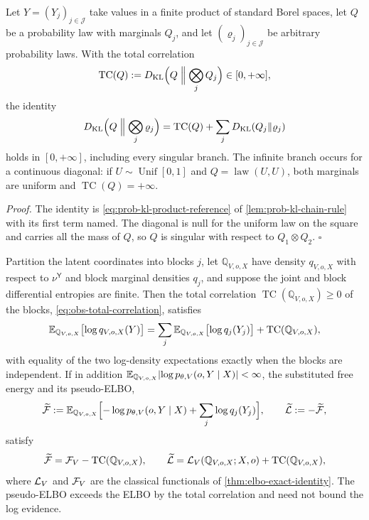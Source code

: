 Let $Y=(Y_j)_{j\in\mathcal J}$ take values in a finite product of standard
Borel spaces, let $Q$ be a probability law with marginals $Q_j$, and let
$(\varrho_j)_{j\in\mathcal J}$ be arbitrary probability laws. With the total
correlation
\begin{equation}
\operatorname{TC}(Q):=D_{\mathrm{KL}}\Bigl(Q\Bigm\Vert\bigotimes_{j}Q_j\Bigr)\in[0,+\infty],
\label{eq:obs-total-correlation}
\end{equation}
the identity
\begin{equation}
D_{\mathrm{KL}}\Bigl(Q\Bigm\Vert\bigotimes_j\varrho_j\Bigr)
=\operatorname{TC}(Q)+\sum_jD_{\mathrm{KL}}(Q_j\Vert\varrho_j)
\label{eq:elbo-total-correlation-chain}
\end{equation}
holds in $[0,+\infty]$, including every singular branch. The infinite branch
occurs for a continuous diagonal: if $U\sim\operatorname{Unif}[0,1]$ and
$Q=\operatorname{law}(U,U)$, both marginals are uniform and
$\operatorname{TC}(Q)=+\infty$. 

\noindent\emph{Proof.}
The identity is \eqref{eq:prob-kl-product-reference} of
\cref{lem:prob-kl-chain-rule} with its first term named. The diagonal is null
for the uniform law on the square and carries all the mass of $Q$, so $Q$ is
singular with respect to $Q_1\otimes Q_2$. \hfill$\square$

Partition the latent coordinates into blocks $j$, let $\mathbb Q_{V,o,X}$
have density $q_{V,o,X}$ with respect to $\nu^{\mathsf Y}$ and block marginal
densities $q_j$, and suppose the joint and block differential entropies are
finite. Then the total correlation
$\operatorname{TC}(\mathbb Q_{V,o,X})\geq0$ of the blocks,
\eqref{eq:obs-total-correlation}, satisfies
\begin{equation}
\mathbb E_{\mathbb Q_{V,o,X}}\bigl[\log q_{V,o,X}(Y)\bigr]
=\sum_j\mathbb E_{\mathbb Q_{V,o,X}}\bigl[\log q_j(Y_j)\bigr]
+\operatorname{TC}(\mathbb Q_{V,o,X}),
\label{eq:elbo-entropy-defect}
\end{equation}
with equality of the two log-density expectations exactly when the blocks are
independent. If in addition
$\mathbb E_{\mathbb Q_{V,o,X}}\lvert\log p_{\theta,V}(o,Y\mid X)\rvert<\infty$, the
substituted free energy and its pseudo-ELBO,
\begin{equation}
\widetilde{\mathcal F}
:=\mathbb E_{\mathbb Q_{V,o,X}}\Bigl[-\log p_{\theta,V}(o,Y\mid X)
+\sum_j\log q_j(Y_j)\Bigr],
\qquad
\widetilde{\mathcal L}:=-\widetilde{\mathcal F},
\label{eq:elbo-substituted-free-energy}
\end{equation}
satisfy
\begin{equation}
\widetilde{\mathcal F}=\mathcal F_V-\operatorname{TC}(\mathbb Q_{V,o,X}),
\qquad
\widetilde{\mathcal L}=\mathcal L_V(\mathbb Q_{V,o,X};X,o)+\operatorname{TC}(\mathbb Q_{V,o,X}),
\label{eq:elbo-total-correlation-signs}
\end{equation}
where $\mathcal L_V$ and $\mathcal F_V$ are the classical functionals of
\cref{thm:elbo-exact-identity}. The pseudo-ELBO exceeds the ELBO by the total
correlation and need not bound the log evidence. 

